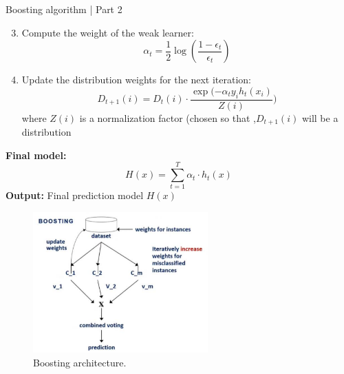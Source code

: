 \newpage

\begin{tcolorbox}[colback=blue!5, colframe=blue!80, boxrule=0pt]
    \begin{algorithm} [H]
    \setcounter{algorithm}{5}
        \caption{Boosting algorithm | Part 2}
        \begin{enumerate}
        \setcounter{enumi}{2}
            \item Compute the weight of the weak learner:
            \[
            \alpha_t = \frac{1}{2} \log \left( \frac{1 - \epsilon_t}{\epsilon_t} \right)
            \]
            \item Update the distribution weights for the next iteration:
            \[
            D_{t+1}(i) = D_t(i) \cdot \frac{\exp( -\alpha_t y_i h_t(x_i)}{Z(i)} )
            \]
            where $Z(i)$ is a normalization factor (chosen so that ,$D_{t+1}(i)$ will be a distribution
        \end{enumerate}
        \textbf{Final model:}
        \[
        H(x) = \sum_{t=1}^{T} \alpha_t \cdot h_t(x)
        \]
        \textbf{Output:} Final prediction model $H(x)$
    \end{algorithm}
\end{tcolorbox}

\begin{figure}[H] 
    \centering
    \includegraphics[width=0.6\textwidth]{Machine_learning_thesis/Images/Boosting.png}
    \caption{Boosting architecture.} 
    \label{fig:Boosting} 
\end{figure}

\newpage

